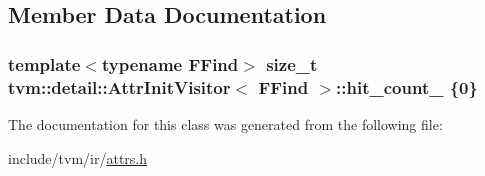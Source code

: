 \subsection{Member Data Documentation}
\subsubsection[{\texorpdfstring{hit\+\_\+count\+\_\+}{hit_count_}}]{\setlength{\rightskip}{0pt plus 5cm}template$<$typename F\+Find$>$ size\+\_\+t {\bf tvm\+::detail\+::\+Attr\+Init\+Visitor}$<$ F\+Find $>$\+::hit\+\_\+count\+\_\+ \{0\}}\hypertarget{classtvm_1_1detail_1_1AttrInitVisitor_a40694e8ade57b3e5167ec74404188f9e}{}\label{classtvm_1_1detail_1_1AttrInitVisitor_a40694e8ade57b3e5167ec74404188f9e}


The documentation for this class was generated from the following file\+:\begin{DoxyCompactItemize}
\item 
include/tvm/ir/\hyperlink{ir_2attrs_8h}{attrs.\+h}\end{DoxyCompactItemize}
